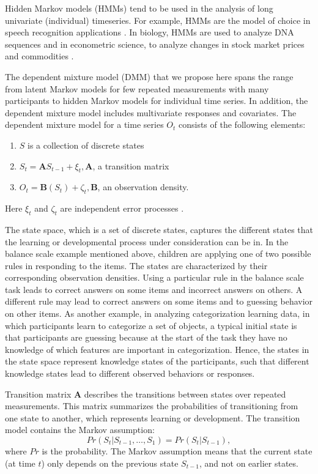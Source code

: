 \documentclass[a4paper,12pt,man]{apa} %
\newcommand{\mat}{\mathbf}
\begin{document}
\nocite{McCutcheon1987}

Hidden Markov models (HMMs) tend to be used in the analysis of long
univariate (individual) timeseries.  For example, HMMs are the model
of choice in speech recognition applications \cite{Rabiner1989}.  In
biology, HMMs are used to analyze DNA sequences \cite{Krogh1998} and
in econometric science, to analyze changes in stock market prices and
commodities \cite{Kim1994}.

The dependent mixture model (DMM) that we propose here spans the range
from latent Markov models for few repeated measurements with many
participants to hidden Markov models for individual time series.  In
addition, the dependent mixture model includes multivariate responses
and covariates.  The dependent mixture model for a time series $O_{t}$
consists of the following elements:
\begin{enumerate}
	\item $S$ is a collection of discrete states
	\item $S_{t} = \mat{A}S_{t-1}+\xi_{t}, \mat{A}$, a transition matrix
	\item $O_{t} = \mat{B}(S_{t}) + \zeta_{t}, \mat{B}$,  an observation density.
\end{enumerate}
Here $\xi_{t}$ and $\zeta_{t}$ are independent error processes 
\cite{Elliott1995}. 

The state space, which is a set of discrete states, captures the
different states that the learning or developmental process under
consideration can be in.  In the balance scale example mentioned
above, children are applying one of two possible rules in responding
to the items.  The states are characterized by their corresponding
observation densities.  Using a particular rule in the balance scale
task leads to correct answers on some items and incorrect answers on
others.  A different rule may lead to correct answers on some items
and to guessing behavior on other items.  As another example, in
analyzing categorization learning data, in which participants learn to
categorize a set of objects, a typical initial state is that
participants are guessing because at the start of the task they have
no knowledge of which features are important in categorization.
Hence, the states in the state space represent knowledge states of the
participants, such that different knowledge states lead to different
observed behaviors or responses.

Transition matrix $\mat{A}$ describes the transitions between states
over repeated measurements.  This matrix summarizes the probabilities
of transitioning from one state to another, which represents learning
or development.  The transition model contains the Markov assumption:
$$Pr(S_{t}|S_{t-1}, \ldots, S_{1}) = Pr(S_{t}|S_{t-1}),$$
where $Pr$ is the probability.  The Markov assumption means that the
current state (at time $t$) only depends on the previous state
$S_{t-1}$, and not on earlier states. 
\end{document}
